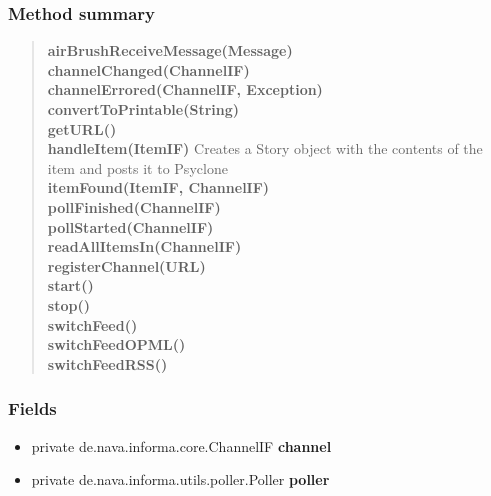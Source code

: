 {{\subsubsection{Method summary}{
\begin{verse}
{\bf airBrushReceiveMessage(Message)} \\
{\bf channelChanged(ChannelIF)} \\
{\bf channelErrored(ChannelIF, Exception)} \\
{\bf convertToPrintable(String)} \\
{\bf getURL()} \\
{\bf handleItem(ItemIF)} Creates a Story object with the contents of the item and posts it to Psyclone\\
{\bf itemFound(ItemIF, ChannelIF)} \\
{\bf pollFinished(ChannelIF)} \\
{\bf pollStarted(ChannelIF)} \\
{\bf readAllItemsIn(ChannelIF)} \\
{\bf registerChannel(URL)} \\
{\bf start()} \\
{\bf stop()} \\
{\bf switchFeed()} \\
{\bf switchFeedOPML()} \\
{\bf switchFeedRSS()} \\
\end{verse}
}
\subsubsection{Fields}{
\begin{itemize}
\item{
\label{amber.crawler.RSS.channel}private de.nava.informa.core.ChannelIF {\bf channel}}
\item{
\label{amber.crawler.RSS.poller}private de.nava.informa.utils.poller.Poller {\bf poller}}
\end{itemize}
}
}}
